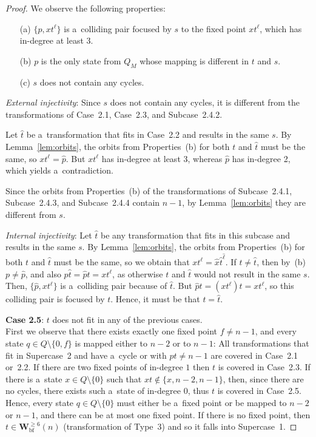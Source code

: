 \documentclass{amsart}
\renewcommand{\ge}{\geqslant}
\newcommand{\Wbf}{\mathbf{W}^{\ge 6}_{\mathrm{bf}}}
\newcommand{\e}[1]{\hat{#1}}
\begin{document}
\begin{proof}
We observe the following properties:
\begin{enumerate}
\item[(a)] $\{p, xt^\ell\}$ is a~colliding pair focused by $s$ to the fixed point $xt^\ell$, which has in-degree at least $3$.

\item[(b)] $p$ is the only state from $Q_M$ whose mapping is different in $t$ and $s$.

\item[(c)] $s$ does not contain any cycles.
\end{enumerate}

\textit{External injectivity}:
Since $s$ does not contain any cycles, it is different from the transformations of Case~2.1, Case~2.3, and Subcase~2.4.2.

Let $\e{t}$ be a~transformation that fits in Case~2.2 and results in the same $s$.
By Lemma~\ref{lem:orbits}, the orbits from Properties~(b) for both $t$ and $\e{t}$ must be the same, so $xt^\ell = \e{p}$.
But $xt^\ell$ has in-degree at least 3, whereas $\e{p}$ has in-degree 2, which yields a~contradiction.

Since the orbits from Properties~(b) of the transformations of Subcase~2.4.1, Subcase~2.4.3, and Subcase~2.4.4 contain $n-1$, by Lemma~\ref{lem:orbits} they are different from $s$.

\textit{Internal injectivity}:
Let $\e{t}$ be any transformation that fits in this subcase and results in the same $s$.
By Lemma~\ref{lem:orbits}, the orbits from Properties~(b) for both $t$ and $\e{t}$ must be the same, so we obtain that $xt^\ell = \e{x}\e{t}^{\e{\ell}}$.
If $t \neq \e{t}$, then by~(b) $p \neq \e{p}$, and also $p\e{t} = \e{p}t = xt^\ell$, as otherwise $t$ and $\e{t}$ would not result in the same $s$.
Then, $\{\e{p},xt^\ell\}$ is a~colliding pair because of $\e{t}$.
But $\e{p}t = (xt^{\ell})t = xt^\ell$, so this colliding pair is focused by $t$.
Hence, it must be that $t = \e{t}$.

\textbf{Case 2.5}: $t$ does not fit in any of the previous cases.\\
First we observe that there exists exactly one fixed point $f \neq n-1$, and every state $q \in Q \setminus \{0,f\}$ is mapped either to $n-2$ or to $n-1$:
All transformations that fit in Supercase~2 and have a~cycle or with $p t \neq n-1$ are covered in Case~2.1 or~2.2.
If there are two fixed points of in-degree $1$ then $t$ is covered in Case~2.3.
If there is a~state $x \in Q\setminus \{0\}$ such that $xt \notin \{x,n-2,n-1\}$, then, since there are no cycles, there exists such a~state of in-degree $0$, thus $t$ is covered in Case~2.5.
Hence, every state $q\in Q\setminus \{0\}$ must either be a~fixed point or be mapped to $n-2$ or $n-1$, and there can be at most one fixed point.
If there is no fixed point, then $t \in \Wbf(n)$ (transformation of Type~3) and so it falls into Supercase~1.


\end{proof}
\end{document}
